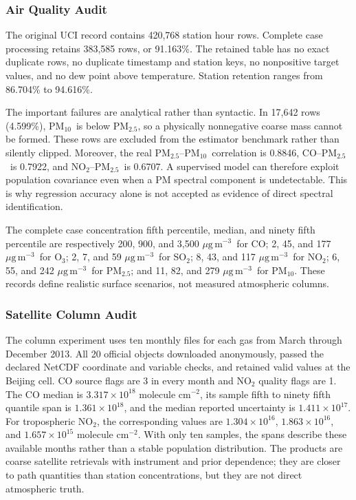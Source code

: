 \documentclass[conference]{IEEEtran}
\newcommand{\ugm}{\ensuremath{\mu\mathrm{g\,m}^{-3}}}
\newcommand{\pmfive}{PM$_{2.5}$}
\newcommand{\pmten}{PM$_{10}$}
\begin{document}
\subsubsection{Air Quality Audit}

The original UCI record contains 420,768 station hour rows. Complete case processing retains 383,585 rows, or 91.163\%. The retained table has no exact duplicate rows, no duplicate timestamp and station keys, no nonpositive target values, and no dew point above temperature. Station retention ranges from 86.704\% to 94.616\%.

The important failures are analytical rather than syntactic. In 17,642 rows (4.599\%), \pmten\ is below \pmfive, so a physically nonnegative coarse mass cannot be formed. These rows are excluded from the estimator benchmark rather than silently clipped. Moreover, the real \pmfive--\pmten\ correlation is 0.8846, CO--\pmfive\ is 0.7922, and NO$_2$--\pmfive\ is 0.6707. A supervised model can therefore exploit population covariance even when a PM spectral component is undetectable. This is why regression accuracy alone is not accepted as evidence of direct spectral identification.

The complete case concentration fifth percentile, median, and ninety fifth percentile are respectively 200, 900, and 3,500 \ugm\ for CO; 2, 45, and 177 \ugm\ for O$_3$; 2, 7, and 59 \ugm\ for SO$_2$; 8, 43, and 117 \ugm\ for NO$_2$; 6, 55, and 242 \ugm\ for \pmfive; and 11, 82, and 279 \ugm\ for \pmten. These records define realistic surface scenarios, not measured atmospheric columns.

\subsubsection{Satellite Column Audit}

The column experiment uses ten monthly files for each gas from March through December 2013. All 20 official objects downloaded anonymously, passed the declared NetCDF coordinate and variable checks, and retained valid values at the Beijing cell. CO source flags are 3 in every month and NO$_2$ quality flags are 1. The CO median is $3.317\times10^{18}$ molecule cm$^{-2}$, its sample fifth to ninety fifth quantile span is $1.361\times10^{18}$, and the median reported uncertainty is $1.411\times10^{17}$. For tropospheric NO$_2$, the corresponding values are $1.304\times10^{16}$, $1.863\times10^{16}$, and $1.657\times10^{15}$ molecule cm$^{-2}$. With only ten samples, the spans describe these available months rather than a stable population distribution. The products are coarse satellite retrievals with instrument and prior dependence; they are closer to path quantities than station concentrations, but they are not direct atmospheric truth.
\end{document}
